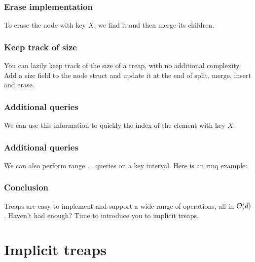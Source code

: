 \begin{frame}
	\frametitle{Erase implementation}

	To erase the node with key $X$, we find it and then merge its children.

	\begin{center}
		
	\end{center}
\end{frame}

\begin{frame}
	\frametitle{Keep track of size}

	You can lazily keep track of the size of a treap, with no additional complexity. Add a size field to the node struct and update it at the end of split, merge, insert and erase.

	\begin{center}
		
	\end{center}
\end{frame}

\begin{frame}
	\frametitle{Additional queries}

	We can use this information to quickly the index of the element with key $X$.

	\begin{center}
		
	\end{center}
\end{frame}

\begin{frame}
	\frametitle{Additional queries}

	We can also perform range ... queries on a key interval. Here is an rmq example:

	\begin{center}
		
	\end{center}
\end{frame}

\begin{frame}
	\frametitle{Conclusion}

	Treaps are easy to implement and support a wide range of operations, all in $\mathcal O(d)$. Haven't had enough? Time to introduce you to implicit treaps.
\end{frame}

\section{Implicit treaps}

